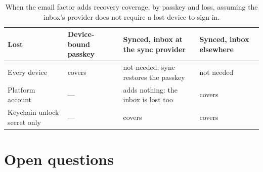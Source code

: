 \begin{table}[h]
  \caption{When the email factor adds recovery coverage, by passkey and
    loss, assuming the inbox's provider does not require a lost device to
    sign in.}
  \label{tab:losses}
  \small
  \begin{tabularx}{\columnwidth}{@{}>{\raggedright\arraybackslash}p{}>{\raggedright\arraybackslash}X>{\raggedright\arraybackslash}X>{\raggedright\arraybackslash}X@{}}
    \toprule
    Lost & Device-bound passkey & Synced, inbox at the sync provider & Synced, inbox elsewhere \\
    \midrule
    Every device & covers & not needed: sync restores the passkey & not needed \\
    Platform account & --- & adds nothing: the inbox is lost too & covers \\
    Keychain unlock secret only & --- & covers & covers \\
    \bottomrule
  \end{tabularx}
\end{table}

\section{Open questions}\label{app:open}

